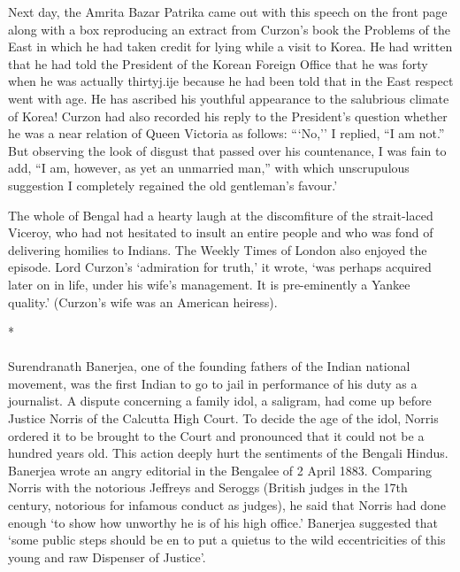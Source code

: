 Next day, the Amrita Bazar Patrika came out with this speech on the front page along with a box reproducing an extract from Curzon's book the Problems of the East in which he had taken credit for lying while a visit to Korea. He had written that he had told the President of the Korean Foreign Office that he was forty when he was actually thirtyj.ije because he had been told that in the East respect went with age. He has ascribed his youthful appearance to the salubrious climate of Korea! Curzon had also recorded his reply to the President's question whether he was a near relation of Queen Victoria as follows: ```No,'' I replied, ``I am not.'' But observing the look of disgust that passed over his countenance, I was fain to add, ``I am, however, as yet an unmarried man,'' with which unscrupulous suggestion I completely regained the old gentleman's favour.'

The whole of Bengal had a hearty laugh at the discomfiture of the strait-laced Viceroy, who had not hesitated to insult an entire people and who was fond of delivering homilies to Indians. The Weekly Times of London also enjoyed the episode. Lord Curzon's `admiration for truth,' it wrote, `was perhaps acquired later on in life, under his wife's management. It is pre-eminently a Yankee quality.' (Curzon's wife was an American heiress).

\begin{center}*\end{center}

\paragraph*{}

Surendranath Banerjea, one of the founding fathers of the Indian national movement, was the first Indian to go to jail in performance of his duty as a journalist. A dispute concerning a family idol, a saligram, had come up before Justice Norris of the Calcutta High Court. To decide the age of the idol, Norris ordered it to be brought to the Court and pronounced that it could not be a hundred years old. This action deeply hurt the sentiments of the Bengali Hindus. Banerjea wrote an angry editorial in the Bengalee of 2 April 1883. Comparing Norris with the notorious Jeffreys and Seroggs (British judges in the 17th century, notorious for infamous conduct as judges), he said that Norris had done enough `to show how unworthy he is of his high office.' Banerjea suggested that `some public steps should be en to put a quietus to the wild eccentricities of this young and raw Dispenser of Justice'.

